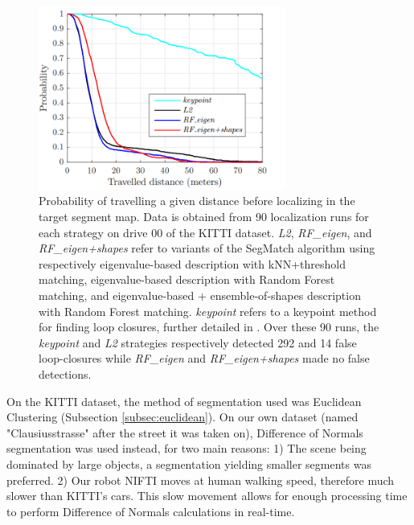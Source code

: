 \begin{figure}
  \centering
  \includegraphics[width=3.2in]{images/segmatch_vs_keypoints.png}
  \caption{Probability of travelling a given distance before localizing in the target segment map. Data is obtained from 90 localization runs for each strategy on drive 00 of the KITTI  dataset. \textit{L2}, \textit{RF\_eigen}, and \textit{RF\_eigen+shapes} refer to variants of the SegMatch algorithm using respectively eigenvalue-based description with kNN+threshold matching, eigenvalue-based description with Random Forest matching, and eigenvalue-based + ensemble-of-shapes description with Random Forest matching. \textit{keypoint} refers to a keypoint method for finding loop closures, further detailed in \citet{segmatch}. Over these 90 runs, the \textit{keypoint} and \textit{L2} strategies respectively detected 292 and 14 false loop-closures while \textit{RF\_eigen} and \textit{RF\_eigen+shapes} made no false detections.}
  \label{fig:segmatch-vs-keypoints}
\end{figure}

On the KITTI dataset, the method of segmentation used was Euclidean Clustering (Subsection \ref{subsec:euclidean}). On our own dataset (named "Clausiusstrasse" after the street it was taken on), Difference of Normals segmentation was used instead, for two main reasons: 1) The scene being dominated by large objects, a segmentation yielding smaller segments was preferred. 2) Our robot NIFTI moves at human walking speed, therefore much slower than KITTI's cars. This slow movement allows for enough processing time to perform Difference of Normals calculations in real-time.\\

